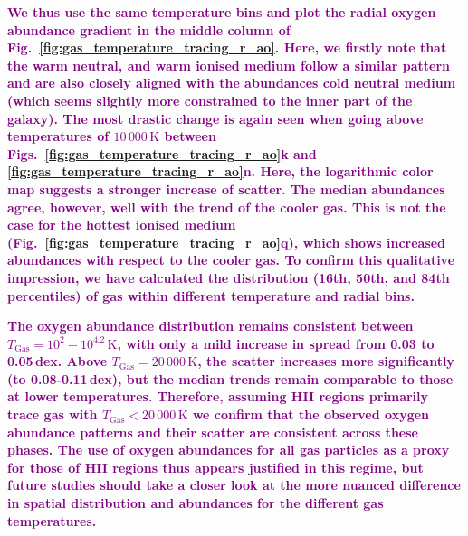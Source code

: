 \documentclass[twocolumn,apj,numberedappendix,appendixfloats,twocolappendix]{openjournal}
\newcommand{\adjusted}[1]{\textbf{\textcolor{purple}{#1}}}
\begin{document}
\adjusted{We thus use the same temperature bins and plot the radial oxygen abundance gradient in the middle column of Fig.~\ref{fig:gas_temperature_tracing_r_ao}. Here, we firstly note that the warm neutral, and warm ionised medium follow a similar pattern and are also closely aligned with the abundances cold neutral medium (which seems slightly more constrained to the inner part of the galaxy). The most drastic change is again seen when going above temperatures of $10\,000\,\mathrm{K}$ between Figs.~\ref{fig:gas_temperature_tracing_r_ao}k and \ref{fig:gas_temperature_tracing_r_ao}n. Here, the logarithmic color map suggests a stronger increase of scatter. The median abundances agree, however, well with the trend of the cooler gas. This is not the case for the hottest ionised medium (Fig.~\ref{fig:gas_temperature_tracing_r_ao}q), which shows increased abundances with respect to the cooler gas. To confirm this qualitative impression, we have calculated the distribution (16th, 50th, and 84th percentiles) of gas within different temperature and radial bins.}

\adjusted{The oxygen abundance distribution remains consistent between $T_\mathrm{Gas} = 10^2-10^{4.2}\,\mathrm{K}$, with only a mild increase in spread from 0.03 to 0.05\,dex. Above $T_\mathrm{Gas} = 20\,000\,\mathrm{K}$, the scatter increases more significantly (to 0.08-0.11\,dex), but the median trends remain comparable to those at lower temperatures. Therefore, assuming HII regions primarily trace gas with $T_\mathrm{Gas} < 20\,000\,\mathrm{K}$ we confirm that the observed oxygen abundance patterns and their scatter are consistent across these phases. The use of oxygen abundances for all gas particles as a proxy for those of HII regions thus appears justified in this regime, but future studies should take a closer look at the more nuanced difference in spatial distribution and abundances for the different gas temperatures.}
\end{document}
